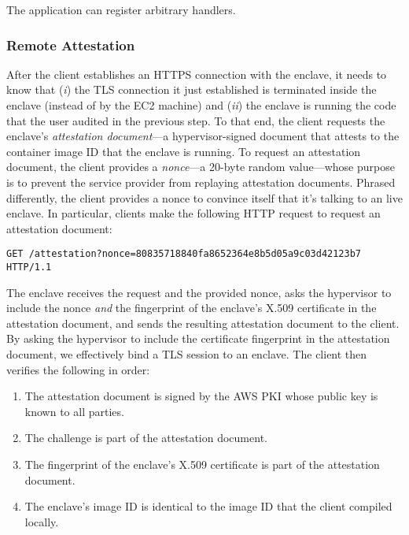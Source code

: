 The application can register arbitrary handlers.


\subsubsection{Remote Attestation}
\label{sec:attestation}

After the client establishes an HTTPS connection with the enclave, it needs to know that (\emph{i}) the TLS connection it just established is terminated inside the enclave (instead of by the EC2 machine) and (\emph{ii}) the enclave is running the code that the user audited in the previous step.  To that end, the client requests the enclave's \emph{attestation document}---a hypervisor-signed document that attests to the container image ID that the enclave is running.  To request an attestation document, the client provides a \emph{nonce}---a 20-byte random value---whose purpose is to prevent the service provider from replaying attestation documents.  Phrased differently, the client provides a nonce to convince itself that it's talking to an live enclave.  In particular, clients make the following HTTP request to request an attestation document:

\begin{lstlisting}
GET /attestation?nonce=80835718840fa8652364e8b5d05a9c03d42123b7 HTTP/1.1
\end{lstlisting}

The enclave receives the request and the provided nonce, asks the hypervisor to include the nonce \emph{and} the fingerprint of the enclave's X.509 certificate in the attestation document, and sends the resulting attestation document to the client.  By asking the hypervisor to include the certificate fingerprint in the attestation document, we effectively bind a TLS session to an enclave.  The client then verifies the following in order:

\begin{enumerate}
    \item The attestation document is signed by the AWS PKI whose public key is known to all parties.
    \item The challenge is part of the attestation document.
    \item The fingerprint of the enclave's X.509 certificate is part of the attestation document.
    \item The enclave's image ID is identical to the image ID that the client compiled locally.
\end{enumerate}

